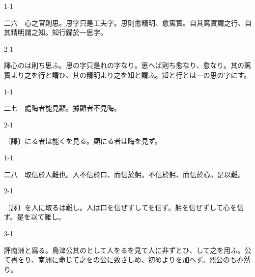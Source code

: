 \documentclass[tate,paper=b6j,jafontsize=9pt]{jlreq}
\begin{document}
\begin{azconvIndented}{1\zw}{-1\zw}

二六　心之官則思。思字只是工夫字。思則愈精明、愈篤實。自其篤實謂之行、自其精明謂之知。知行歸於一思字。

\end{azconvIndented}
\begin{azconvIndented}{2\zw}{-1\zw}

譯心のは則ち思ふ。思の字只是れの字なり。思へば則ち愈なり、愈なり。其の篤實より之を行と謂ひ、其の精明より之を知と謂ふ。知と行とは一の思の字にす。

\end{azconvIndented}

\begin{azconvIndented}{1\zw}{-1\zw}

二七　處晦者能見顯。據顯者不見晦。

\end{azconvIndented}
\begin{azconvIndented}{2\zw}{-1\zw}

〔譯〕にる者は能くを見る。顯にる者は晦を見ず。

\end{azconvIndented}

\begin{azconvIndented}{1\zw}{-1\zw}

二八　取信於人難也。人不信於口、而信於躬。不信於躬、而信於心。是以難。

\end{azconvIndented}
\begin{azconvIndented}{2\zw}{-1\zw}

〔譯〕を人に取るは難し。人は口を信ぜずしてを信ず。躬を信ぜずして心を信ず。是を以て難し。

\end{azconvIndented}
\begin{azconvIndented}{3\zw}{-1\zw}

評南洲と爲る。島津公其のとして人をるを見て人に非ずとひ、して之を用ふ。公て書をり、南洲に命じて之をの公に致さしめ、初めよりを加へず。烈公のも亦然り。

\end{azconvIndented}
\end{document}
